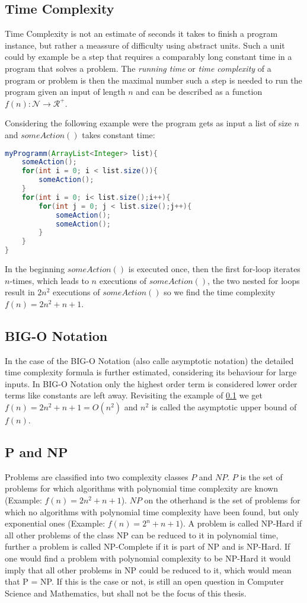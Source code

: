 \subsection{Time Complexity}\label{TimeComplexity}
 Time Complexity is not an estimate of seconds it takes to finish a program instance, but rather a meassure of difficulty using
 abstract units. Such a unit could by example be a step that requires a comparably long constant time in a program that solves a problem. The \emph{running time} or \emph{time complexity} of a program or problem is then the maximal number such a step is needed to run the program given an input of length $n$ and can be described as a function $f(n): \mathcal{N} \rightarrow \mathcal{R}^+$. 

Considering the following example were the program gets as input a list of size $n$ and $someAction()$ takes constant time:
\lstset{basicstyle=\ttfamily}
\begin{lstlisting}[language=java,frame=single]
myProgramm(ArrayList<Integer> list){
    someAction();
    for(int i = 0; i < list.size()){
        someAction();
    }
    for(int i = 0; i< list.size();i++){
        for(int j = 0; j < list.size();j++){
            someAction();
            someAction();
        }
    }
}
\end{lstlisting}
In the beginning $someAction()$ is executed once, then the first for-loop iterates $n$-times, which leads to $n$ executions of $someAction()$, the two nested for loops result in $2n^2$ executions of $someAction()$ so we find the time complexity $f(n)=2n^2+n+1$.

\subsection{BIG-O Notation}
In the case of the BIG-O Notation (also calle asymptotic notation) the detailed time complexity formula is further estimated, considering its behaviour for large inputs. In BIG-O Notation only the highest order term is considered lower order terms like constants are left away. Revisiting the example of \ref{TimeComplexity} we get $f(n) = 2n^2+n+1 = O(n^2)$ and $n^2$ is called the asymptotic upper bound of $f(n)$.

\subsection{P and NP}
Problems are classified into two complexity classes $P$ and $NP$. $P$ is the set of problems for which algorithms with polynomial time complexity are known (Example: $f(n)=2n^2+n+1$). $NP$ on the otherhand is the set of problems for which no algorithms with polynomial time complexity have been found, but only exponential ones (Example: $f(n)=2^n+n+1$). A problem is called NP-Hard if all other problems of the class NP can be reduced to it in polynomial time, further a problem is called NP-Complete if it is part of NP and is NP-Hard. If one would find a problem with polynomial complexity to be NP-Hard it would imply that all other problems in NP could be reduced to it, which would mean that P = NP. If this is the case or not, is still an open question in Computer Science and Mathematics, but shall not be the focus of this thesis.

